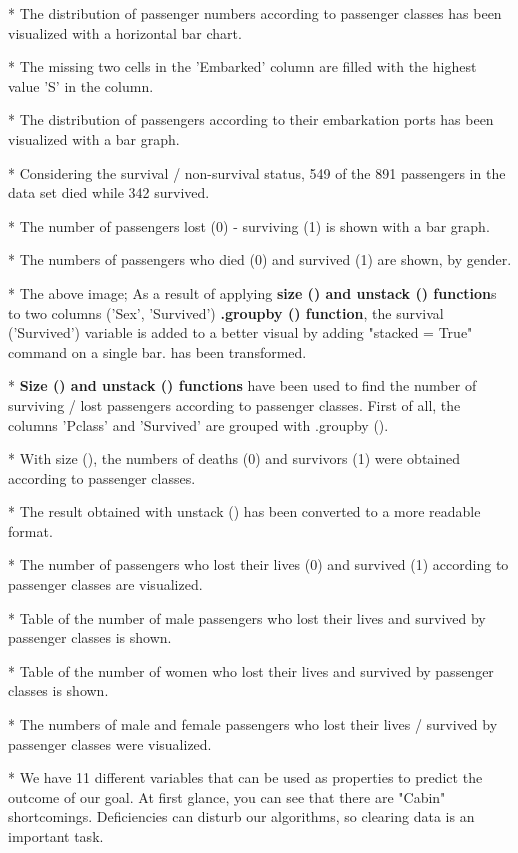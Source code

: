 \documentclass[onecolumn]{article}
\begin{document}
* The distribution of passenger numbers according to passenger classes has been visualized with a horizontal bar chart.

* The missing two cells in the 'Embarked' column are filled with the highest value 'S' in the column.

* The distribution of passengers according to their embarkation ports has been visualized with a bar graph.

* Considering the survival / non-survival status, 549 of the 891 passengers in the data set died while 342 survived.

* The number of passengers lost (0) - surviving (1) is shown with a bar graph.

* The numbers of passengers who died (0) and survived (1) are shown, by gender.

* The above image; As a result of applying \textbf{size () and unstack () function}s to two columns ('Sex', 'Survived')\textbf{ .groupby () function}, the survival ('Survived') variable is added to a better visual by adding "stacked = True" command on a single bar. has been transformed.

* \textbf{Size () and unstack () functions} have been used to find the number of surviving / lost passengers according to passenger classes. First of all, the columns 'Pclass' and 'Survived' are grouped with .groupby ().

* With size (), the numbers of deaths (0) and survivors (1) were obtained according to passenger classes.


* The result obtained with unstack () has been converted to a more readable format.

* The number of passengers who lost their lives (0) and survived (1) according to passenger classes are visualized.

* Table of the number of male passengers who lost their lives and survived by passenger classes is shown.


* Table of the number of women who lost their lives and survived by passenger classes is shown.


* The numbers of male and female passengers who lost their lives / survived by passenger classes were visualized.

* We have 11 different variables that can be used as properties to predict the outcome of our goal. At first glance, you can see that there are "Cabin" shortcomings. Deficiencies can disturb our algorithms, so clearing data is an important task.
\end{document}
